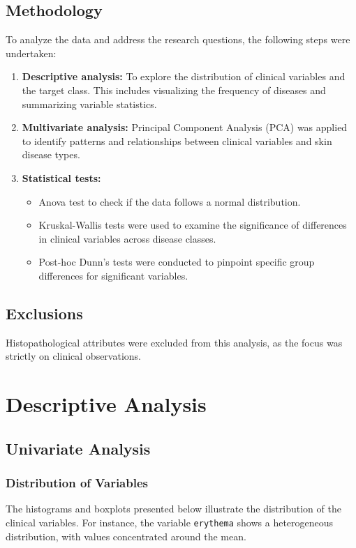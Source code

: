 \documentclass[a4paper,12pt]{article}
\begin{document}
\subsection{Methodology}
To analyze the data and address the research questions, the following steps were undertaken:
\begin{enumerate}
    \item \textbf{Descriptive analysis:} To explore the distribution of clinical variables and the target class. This includes visualizing the frequency of diseases and summarizing variable statistics.
    \item \textbf{Multivariate analysis:} Principal Component Analysis (PCA) was applied to identify patterns and relationships between clinical variables and skin disease types.
    \item \textbf{Statistical tests:} 
    \begin{itemize} 
        \item Anova test to check if the data follows a normal distribution.
        \item Kruskal-Wallis tests were used to examine the significance of differences in clinical variables across disease classes.
        \item Post-hoc Dunn’s tests were conducted to pinpoint specific group differences for significant variables.
    \end{itemize}
\end{enumerate}

\subsection{Exclusions}
Histopathological attributes were excluded from this analysis, as the focus was strictly on clinical observations.

\section{Descriptive Analysis}

\subsection{Univariate Analysis}

\subsubsection{Distribution of Variables}

The histograms and boxplots presented below illustrate the distribution of the clinical variables. For instance, the variable \texttt{erythema} shows a heterogeneous distribution, with values concentrated around the mean.
\end{document}
